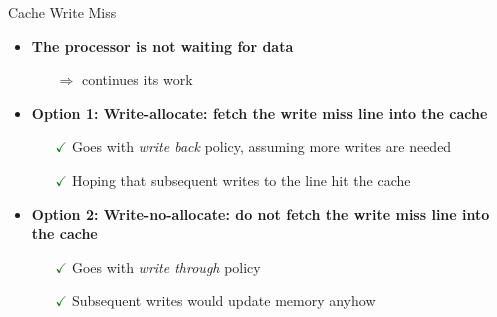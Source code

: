 \documentclass[aspectratio=169,12pt]{beamer}
\begin{document}
\begin{frame}{Cache Write Miss}
\begin{itemize}
  \item \textbf{The processor is not waiting for data}
  \begin{itemize}
    \item[$\Rightarrow$] continues its work
  \end{itemize}
  
  \vspace{0.5cm}
  
  \item \textbf{Option 1: Write-allocate: fetch the write miss line into the cache}
  \begin{itemize}
    \item[\textcolor{green}{$\checkmark$}] Goes with \textit{write back} policy, assuming more writes are needed
    \item[\textcolor{green}{$\checkmark$}] Hoping that subsequent writes to the line hit the cache
  \end{itemize}
  
  \vspace{0.5cm}
  
  \item \textbf{Option 2: Write-no-allocate: do not fetch the write miss line into the cache}
  \begin{itemize}
    \item[\textcolor{green}{$\checkmark$}] Goes with \textit{write through} policy
    \item[\textcolor{green}{$\checkmark$}] Subsequent writes would update memory anyhow
  \end{itemize}
\end{itemize}
\end{frame}
\end{document}
